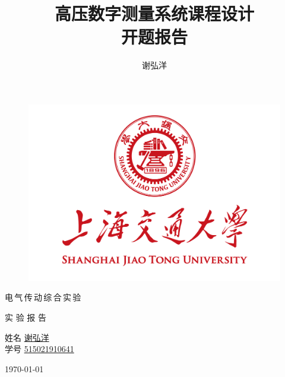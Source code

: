 \documentclass[a4paper,11pt]{ctexart}
\title
{
	\linespread{1.5} \zihao{4}
	高压数字测量系统课程设计 \\ 
	\zihao{2}
	开题报告
}
\author
{
	谢弘洋
}
\date{}
\begin{document}
	\pagestyle{plain}

\begin{figure}[t]
	\setlength{\abovecaptionskip}{-10mm}
	\setlength{\belowcaptionskip}{-60mm}
	\centering
	\includegraphics[scale=0.4]{page1.png}
\end{figure}

\begin{center}
	电\,气\,传\,动\,综\,合\,实\,验 \\
	\vspace{0.7em}
	
	实\hspace{0.5em} 验\hspace{0.5em} 报\hspace{0.5em} 告\\
	\vspace{3em}
		
	\hspace{2em}姓名\hspace{1em} \underline{\hspace{4em}谢弘洋\hspace{4em}}\\
	\vspace{1em}
	\hspace{2em}学号\hspace{1em} \underline{\hspace{2.75em}515021910641\hspace{2.75em}}\\
	\vspace{1em}
	
	\vspace{6em}
	\today
\end{center}
\newpage
\begin{spacing}{1.5}
	\tableofcontents
\end{spacing}
\end{document}
